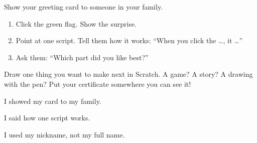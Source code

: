 
\begin{playathome}
Show your greeting card to someone in your family.
\begin{enumerate}[leftmargin=1.4em,itemsep=2pt]
  \item Click the green flag. Show the surprise.
  \item Point at one script. Tell them how it works: \enquote{When you click the \ldots, it \ldots}
  \item Ask them: \enquote{Which part did you like best?}
\end{enumerate}
\end{playathome}

\begin{playathome}
Draw one thing you want to make next in Scratch. A game? A story? A drawing with the pen? Put your certificate somewhere you can see it!
\answerspace{3cm}
\end{playathome}

\begin{selfcheck}
  \item I showed my card to my family.
  \item I said how one script works.
  \item I used my nickname, not my full name.
\end{selfcheck}
